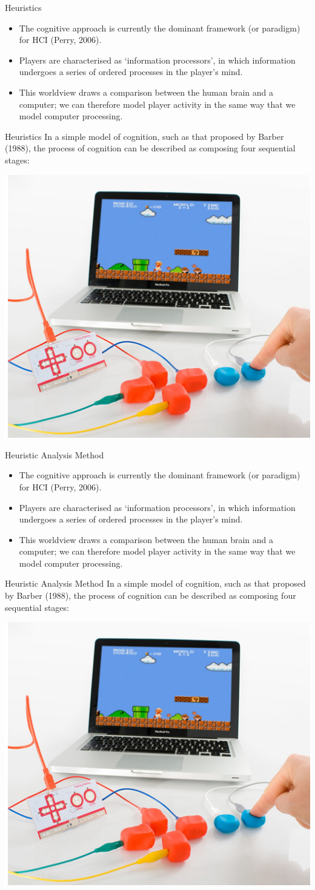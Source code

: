 \begin{frame}{Heuristics}
	\begin{itemize}
		\item The cognitive approach is currently the dominant framework (or paradigm) for HCI (Perry, 2006).
		\item Players are characterised as `information processors', in which information undergoes a series of ordered processes
		in the player's mind.
		\item This worldview draws a comparison between the human brain and a computer; we can therefore model player activity in the same
		way that we model computer processing.
	\end{itemize}
\end{frame}

\begin{frame}{Heuristics}
	In a simple model of cognition, such as that proposed by Barber (1988), the process of cognition can be described as composing four sequential
	stages: 
	
	\vspace{2ex}

	\includegraphics[height=24ex]{MakeyMakey.jpg}
\end{frame}

\begin{frame}{Heuristic Analysis Method}
	\begin{itemize}
		\item The cognitive approach is currently the dominant framework (or paradigm) for HCI (Perry, 2006).
		\item Players are characterised as `information processors', in which information undergoes a series of ordered processes
		in the player's mind.
		\item This worldview draws a comparison between the human brain and a computer; we can therefore model player activity in the same
		way that we model computer processing.
	\end{itemize}
\end{frame}

\begin{frame}{Heuristic Analysis Method}
	In a simple model of cognition, such as that proposed by Barber (1988), the process of cognition can be described as composing four sequential
	stages: 
	
	\vspace{2ex}

	\includegraphics[height=24ex]{MakeyMakey.jpg}
\end{frame}